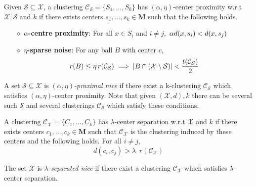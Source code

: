 \documentclass[anon,12pt]{colt2016} %
\newcommand{\mc}{\mathcal}
\newcommand{\mb}{\mathbf}
\begin{document}
\begin{definition}
\label{def:alphaeta}
Given $\mc S \subseteq \mc X$, a clustering $\mc C_{\mc S} = \{S_1, \ldots, S_k\}$ has $(\alpha, \eta)$-center proximity w.r.t $\mc X, \mc S$ and $k$ if there exists centers $s_1, \ldots, s_k \in \mb M$  such that the following holds.
\begin{itemize}[nolistsep, noitemsep]
\label{defn:alphacpnoise}	

\item[$\diamond$] {\bf $\alpha$-centre proximity}: For all $x \in S_i$ and $i\neq j$, $\thinspace\alpha d(x, s_i) < d(x, s_j)$
\item[$\diamond$]{\bf $\eta$-sparse noise}: For any ball $B$ with center $c$, 
\vspace{-0.1in}\begin{align*}
r(B)\leq \eta \thinspace r(\mc{C}_{\mc S}) \implies |B\cap (\mc X\setminus \mc S)| < \frac{t(\mc C_{\mc S})}{2}
\end{align*}
\end{itemize}
\end{definition}

\noindent A set $\mc S \subseteq \mc X$ is {\it $(\alpha, \eta)$-proximal nice} if there exist a k-clustering $\mc C_{\mc S}$ which satisfies $(\alpha, \eta)$-center proximity. Note that given $(\mc X, d), k$ there can be several such $\mc S$ and several clusterings $\mc C_{\mc S}$ which satisfy these conditions.

\begin{definition}
\label{defn:lambdacs}
A clustering $\mc C_{\mc X} = \{C_1, \ldots, C_k\}$ has $\lambda$-center separation w.r.t $\mc X$ and $k$ if there exists centers $c_1, \ldots, c_k \in \mb M$ such that $\mc C_{\mc X}$ is the clustering induced by these centers and the following holds. For all $i\neq j$, 
$$d(c_i, c_j) > \lambda \enspace r(\mc{C}_{\mc{X}})$$
\end{definition}

\noindent The set $\mc X$ is {\it $\lambda$-separated nice} if there exist a clustering $\mc C_{\mc X}$ which satisfies $\lambda$-center separation.
\end{document}
